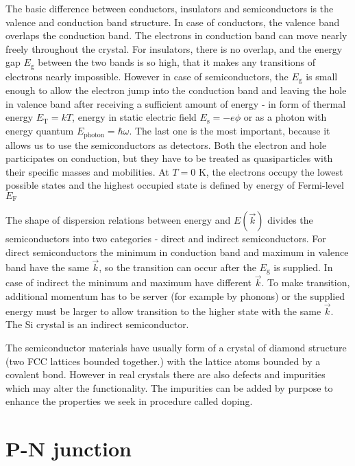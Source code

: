 \par
The basic difference between conductors, insulators and semiconductors is the valence and conduction band structure. In case of conductors, the valence band overlaps the conduction band. The electrons in conduction band can move nearly freely throughout the crystal. For insulators, there is no overlap, and the energy gap $E_{\textrm{g}}$ between the two bands is so high, that it makes any transitions of electrons nearly impossible. However in case of  semiconductors, the $E_{\textrm{g}}$ is small enough to allow the electron jump into the conduction band and leaving the hole in valence band after receiving a sufficient amount of energy - in form of thermal energy $E_{\textrm{T}} = kT$, energy in static electric field $E_{\textrm{s}} = -e\phi$ or as a photon with energy quantum $E_{\textrm{photon}} = \hbar \omega$. The last one is the most important, because it allows us to use the semiconductors as detectors. Both the electron and hole participates on conduction, but they have to be treated as quasiparticles with their specific masses and mobilities. At $T = 0$ K, the electrons occupy the lowest possible states and the highest occupied state is defined by energy of Fermi-level $E_{\textrm{F}}$

\par
 
The shape of dispersion relations between energy and $E(\vec{k})$ divides the semiconductors into two categories - direct and indirect semiconductors. For direct semiconductors the minimum in conduction band and maximum in valence band have the same $\vec{k}$, so the transition can occur after the $E_{\textrm{g}}$ is supplied. In case of indirect the minimum and maximum have different $\vec{k}$. To make transition, additional momentum has to be server (for example by phonons) or the supplied energy must be larger to allow transition to the higher state with the same $\vec{k}$.  The Si crystal is an indirect semiconductor.

\par
The semiconductor materials have usually form of a crystal of diamond structure (two FCC lattices bounded together.) with the lattice atoms bounded by a covalent bond. However in real crystals there are also defects and impurities which may alter the functionality. The impurities can be added by purpose to enhance the properties we seek in procedure called doping. 
 
\section{P-N junction}



